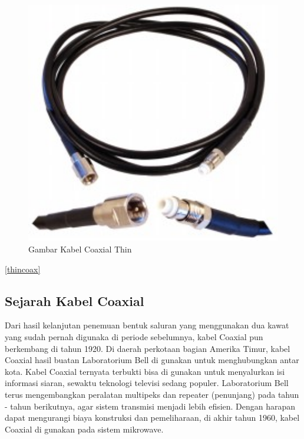 \begin{itemize}
\begin{itemize}
\begin{figure} [ht]
	\centerline{\includegraphics[width=1\textwidth]{figures/thincoax.jpg}}
	\caption{Gambar Kabel Coaxial Thin}
	\label{thickcoax}
\end{figure}

\ref{thincoax}

	\subsection{Sejarah Kabel Coaxial}
	Dari hasil kelanjutan penemuan bentuk saluran yang menggunakan dua kawat yang sudah pernah digunaka di periode sebelumnya, kabel Coaxial pun berkembang di tahun 1920. Di daerah perkotaan bagian Amerika Timur, kabel Coaxial hasil buatan Laboratorium Bell di gunakan untuk menghubungkan antar kota. Kabel Coaxial ternyata terbukti bisa di gunakan untuk menyalurkan isi informasi siaran, sewaktu teknologi televisi sedang populer. Laboratorium Bell terus mengembangkan peralatan multipeks dan repeater (penunjang) pada tahun - tahun berikutnya, agar sistem transmisi menjadi lebih efisien. Dengan harapan dapat mengurangi biaya konstruksi dan pemeliharaan, di akhir tahun 1960, kabel Coaxial di gunakan pada sistem mikrowave.
	

\end{itemize}
\end{itemize}

